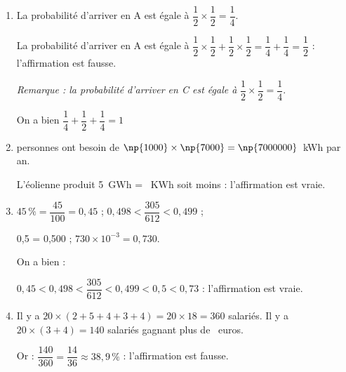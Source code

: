 
\medskip

\begin{enumerate}
\item La probabilité d'arriver en A est égale à $\dfrac{1}{2} \times \dfrac{1}{2} = \dfrac{1}{4}$.

La probabilité d'arriver en A est égale à $\dfrac{1}{2} \times \dfrac{1}{2} + \dfrac{1}{2} \times \dfrac{1}{2} = \dfrac{1}{4} + \dfrac{1}{4} = \dfrac{1}{2}$ : l'affirmation est fausse.

\emph{Remarque : la probabilité d'arriver en {\rm C} est égale à }$\dfrac{1}{2} \times \dfrac{1}{2} = \dfrac{1}{4}$.

On a bien  $\dfrac{1}{4} +  \dfrac{1}{2} +  \dfrac{1}{4} =  1$
\item {} personnes ont besoin de $\np{1000} \times \np{7000} = \np{7000000}$~kWh par an.

L'éolienne produit 5~GWh = ~KWh soit moins : l'affirmation est vraie.
\item $45\,\% = \dfrac{45}{100} = 0,45$ ; $0,498 < \dfrac{305}{612} < 0,499$ ;

0,5 = 0,500 ; $730 \times 10^{-3} = 0,730$.

On a bien :

$0,45 < 0,498 < \dfrac{305}{612}  < 0,499 < 0,5 < 0,73$ : l'affirmation est vraie.
\item Il y a $20 \times (2 + 5 + 4 + 3 + 4) = 20 \times 18 = 360$ salariés.
Il y a $ 20 \times (3 + 4) = 140$ salariés gagnant plus de ~euros.

Or : $\dfrac{140}{360}= \dfrac{14}{36} \approx 38,9\,\%$ : l'affirmation est fausse.
\end{enumerate}

\bigskip

